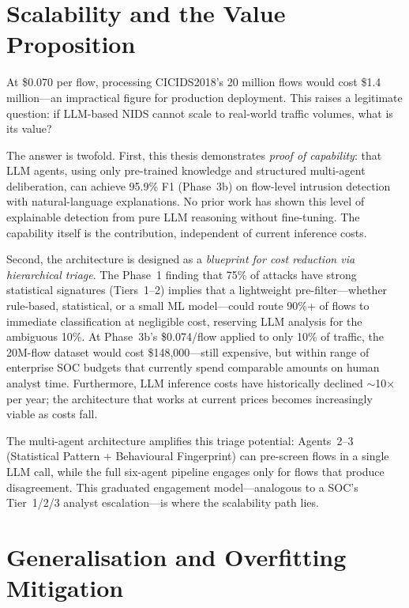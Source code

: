 \documentclass[12pt, a4paper, oneside]{report}
\begin{document}
\section{Scalability and the Value Proposition}
\label{sec:scalability-value}

At \$0.070 per flow, processing CICIDS2018's 20 million flows would cost
\$1.4\,million---an impractical figure for production deployment. This raises a
legitimate question: if LLM-based NIDS cannot scale to real-world traffic volumes,
what is its value?

The answer is twofold. First, this thesis demonstrates \emph{proof of capability}:
that LLM agents, using only pre-trained knowledge and structured multi-agent
deliberation, can achieve 95.9\% F1 (Phase~3b) on flow-level intrusion detection
with natural-language explanations. No prior work has shown this level of
explainable detection from pure LLM reasoning without fine-tuning. The capability
itself is the contribution, independent of current inference costs.

Second, the architecture is designed as a \emph{blueprint for cost reduction via
hierarchical triage}. The Phase~1 finding that 75\% of attacks have strong
statistical signatures (Tiers~1--2) implies that a lightweight pre-filter---whether
rule-based, statistical, or a small ML model---could route 90\%+ of flows to
immediate classification at negligible cost, reserving LLM analysis for the
ambiguous 10\%. At Phase~3b's \$0.074/flow applied to only 10\% of traffic, the
20M-flow dataset would cost \$148{,}000---still expensive, but within range of
enterprise SOC budgets that currently spend comparable amounts on human analyst
time. Furthermore, LLM inference costs have historically declined
$\sim$10$\times$ per year; the architecture that works at current prices becomes
increasingly viable as costs fall.

The multi-agent architecture amplifies this triage potential: Agents~2--3
(Statistical Pattern + Behavioural Fingerprint) can pre-screen flows in a single
LLM call, while the full six-agent pipeline engages only for flows that produce
disagreement. This graduated engagement model---analogous to a SOC's Tier~1/2/3
analyst escalation---is where the scalability path lies.


\section{Generalisation and Overfitting Mitigation}
\label{sec:generalisation}
\end{document}
